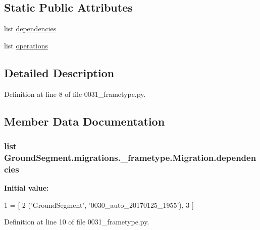 \subsection*{Static Public Attributes}
\begin{DoxyCompactItemize}
\item 
list \hyperlink{class_ground_segment_1_1migrations_1_10031__frametype_1_1_migration_ad83194553cbc24662277aa8aeeca89ad}{dependencies}
\item 
list \hyperlink{class_ground_segment_1_1migrations_1_10031__frametype_1_1_migration_a0694f6b55ca56bb566dcbb44df426a7d}{operations}
\end{DoxyCompactItemize}


\subsection{Detailed Description}


Definition at line 8 of file 0031\+\_\+frametype.\+py.



\subsection{Member Data Documentation}
\hypertarget{class_ground_segment_1_1migrations_1_10031__frametype_1_1_migration_ad83194553cbc24662277aa8aeeca89ad}{}
\subsubsection[{dependencies}]{\setlength{\rightskip}{0pt plus 5cm}list Ground\+Segment.\+migrations.\+\_\+frametype.\+Migration.\+dependencies\hspace{0.3cm}{\ttfamily [static]}}\label{class_ground_segment_1_1migrations_1_10031__frametype_1_1_migration_ad83194553cbc24662277aa8aeeca89ad}
{\bfseries Initial value\+:}
\begin{DoxyCode}
1 = [
2         (\textcolor{stringliteral}{'GroundSegment'}, \textcolor{stringliteral}{'0030\_auto\_20170125\_1955'}),
3     ]
\end{DoxyCode}


Definition at line 10 of file 0031\+\_\+frametype.\+py.

